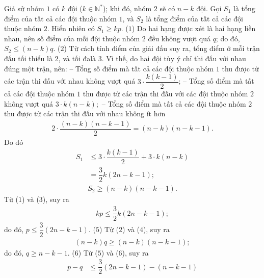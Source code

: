 \begin{multicols}{2}
	Giả sử nhóm $1$ có $k$ đội ($k \in \mathbb{N^*}$); khi đó, nhóm $2$ sẽ có $n - k$ đội.
	\vskip 0.05cm
	Gọi $S_1$  là tổng điểm của tất cả các đội thuộc nhóm $1$, và $S_2$  là tổng điểm của tất cả các đội thuộc nhóm $2$.
	\vskip 0.05cm
	Hiển nhiên có  $S_1 \ge kp$. \hfill         ($1$)
	\vskip 0.05cm
	Do hai hạng được xét là hai hạng liền nhau, nên số điểm của mỗi đội thuộc nhóm $2$ đều không vượt quá $q$; do đó, $S_2 \le (n-k)q$. \hfill ($2$)
	\vskip 0.05cm
	Từ cách tính điểm của giải đấu suy ra, tổng điểm ở mỗi trận đấu tối thiểu là $2$, và tối đa\linebreak là $3$.
	\vskip 0.05cm
	Vì thế, do hai đội tùy ý chỉ thi đấu với nhau đúng một trận, nên:
	\vskip 0.05cm
	-- Tổng số điểm mà tất cả các đội thuộc nhóm $1$ thu được từ các trận thi đấu với nhau không vượt quá $3 \cdot \dfrac{{k\left( {k - 1} \right)}}{2}$;
	\vskip 0.05cm
	-- Tổng số điểm mà tất cả các đội thuộc nhóm $1$ thu được từ các trận thi đấu với các đội thuộc nhóm $2$ không vượt quá $3 \cdot k\left( {n - k} \right);$
	\vskip 0.05cm  
	-- Tổng số điểm mà tất cả các đội thuộc nhóm $2$ thu được từ các trận thi đấu với nhau không ít hơn
	\begin{align*}
		2 \cdot \dfrac{{\left( {n - k} \right)\left( {n - k - 1} \right)}}{2} = \left( {n - k} \right)\left( {n - k - 1} \right).
	\end{align*}
	Do đó
	\begin{align*}
		{S_1} &\le 3 \cdot \dfrac{{k\left( {k - 1} \right)}}{2} + 3 \cdot k\left( {n - k} \right) \\[-0.5ex]
		&= \dfrac{3}{2}k\left( {2n - k - 1} \right); \tag{$3$}
	\end{align*}
	\begin{align*}
		{S_2} \ge \left( {n - k} \right)\left( {n - k - 1} \right). \tag{$4$}
	\end{align*}
	Từ ($1$) và ($3$), suy ra
	\begin{align*}
		kp \le \dfrac{3}{2}k\left( {2n - k - 1} \right);
	\end{align*}
	do đó,  $p \le \dfrac{3}{2}\left( {2n - k - 1} \right).$ \hfill ($5$)
	\vskip 0.05cm
	Từ ($2$) và ($4$), suy ra
	\begin{align*}
		\left( {n - k} \right)q \ge \left( {n - k} \right)\left( {n - k - 1} \right);
	\end{align*}
	do đó, $q \ge n - k - 1$. \hfill ($6$)
	\vskip 0.05cm
	Từ ($5$) và ($6$), suy ra
	\begin{align*}
		p - q &\le \dfrac{3}{2}\left( {2n - k - 1} \right) - \left( {n - k - 1} \right) \\[-0.5ex]

\end{align*}
\end{multicols}

